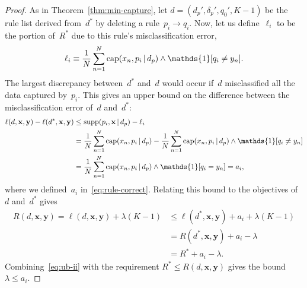 \documentclass[twoside,11pt]{article}
\def\one{\mathds{1}}
\newcommand{\x}{\mathbf{x}}
\newcommand{\y}{\mathbf{y}}
\def\RL{{d}}
\def\Prefix{d_p}
\def\Labels{\delta_p}
\def\Default{q_0}
\def\Obj{R}
\def\Loss{\ell}
\def\Reg{{\lambda}}
\def\Cap{\textnormal{cap}}
\def\Supp{\textnormal{supp}}
\def\OptimalObj{R^*}
\def\OptimalRL{d^*}
\def\one{\mathds{1}}
\newcommand{\nn}{\nonumber}
\newcommand{\given}{\,|\,}
\begin{document}
\begin{arxiv}
\begin{proof}
As in Theorem~\ref{thm:min-capture},
let ${\RL =  (\Prefix', \Labels', \Default', K-1)}$ be the rule list
derived from~$\OptimalRL$ by deleting a rule~${p_i \rightarrow q_i}$.
%
Now, let us define~$\Loss_i$ to be the portion of~$\OptimalObj$
due to this rule's misclassification error,
\begin{align}
\Loss_i \equiv \frac{1}{N} \sum_{n=1}^N
  \Cap(x_n, p_i \given \Prefix) \wedge \one [ q_i \neq y_n ]. \nn
\end{align}
The largest discrepancy between~$\OptimalRL$ and~$\RL$ would
occur if~$\RL$ misclassified all the data captured by~$p_i$.
%
This gives an upper bound on the difference between
the misclassification error of~$\RL$ and~$\OptimalRL$:
\begin{align}
\Loss(\RL, \x, \y) - \Loss(\OptimalRL, \x, \y)
&\le \Supp(p_i, \x \given \Prefix) - \Loss_i \nn \\
&= \frac{1}{N} \sum_{n=1}^N \Cap(x_n, p_i \given \Prefix)
  - \frac{1}{N} \sum_{n=1}^N
  \Cap(x_n, p_i \given \Prefix) \wedge \one [ q_i \neq y_n ] \nn \\
&= \frac{1}{N} \sum_{n=1}^N
  \Cap(x_n, p_i \given \Prefix) \wedge \one [ q_i = y_n ] = a_i, \nn
\end{align}
where we defined~$a_i$ in~\eqref{eq:rule-correct}.
%
Relating this bound to the objectives of~$\RL$ and~$\OptimalRL$ gives
\begin{align}
\Obj(\RL, \x, \y) = \Loss(\RL, \x, \y) + \Reg (K - 1)
&\le \Loss(\OptimalRL, \x, \y) + a_i + \Reg(K - 1) \nn \\
&= \Obj(\OptimalRL, \x, \y) + a_i - \Reg \nn \\
&= \OptimalObj + a_i - \Reg.
\label{eq:ub-ii}
\end{align}
Combining~\eqref{eq:ub-ii} with the requirement
${\OptimalObj \le \Obj(\RL, \x, \y)}$ gives the bound~${\Reg \le a_i}$.
\end{proof}
\end{arxiv}
\end{document}
